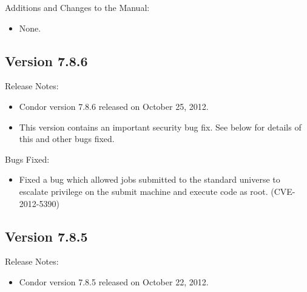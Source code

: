 \noindent Additions and Changes to the Manual:

\begin{itemize}

\item None.

\end{itemize}


\subsection*{\label{sec:New-7-8-6}Version 7.8.6}

\noindent Release Notes:

\begin{itemize}

\item Condor version 7.8.6 released on October 25, 2012.

\item \Security This version contains an important security bug fix.  See below
for details of this and other bugs fixed.

\end{itemize}

\noindent Bugs Fixed:

\begin{itemize}

\item \Security Fixed a bug which allowed jobs submitted to the standard
universe to escalate privilege on the submit machine and execute code as root.
(CVE-2012-5390)

\end{itemize}


\subsection*{\label{sec:New-7-8-5}Version 7.8.5}

\noindent Release Notes:

\begin{itemize}

\item Condor version 7.8.5 released on October 22, 2012.

\end{itemize}



